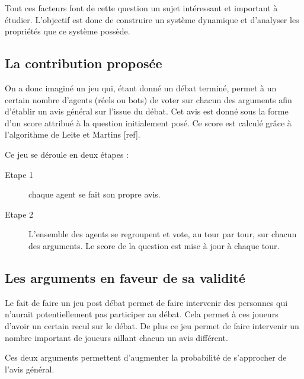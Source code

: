 \documentclass[11pt]{article}
\theoremstyle{defi}
\theoremstyle{not}
\theoremstyle{prob}
\begin{document}
  Tout ces facteurs font de cette question un sujet intéressant et important à étudier. L'objectif est donc de construire un système dynamique et d'analyser les propriétés que ce système possède.


\subsection*{La contribution proposée}
  On a donc imaginé un jeu qui, étant donné un débat terminé, permet à un certain nombre d'agents (réels ou bots) de voter sur chacun des arguments afin d'établir un avis général sur l'issue du débat. Cet avis est donné sous la forme d'un score attribué à la question initialement posé. Ce score est calculé grâce à l'algorithme de Leite et Martins [ref].

  Ce jeu se déroule en deux étapes :
  \begin{description}
    \item[Etape 1] chaque agent se fait son propre avis.
    \item[Etape 2] L'ensemble des agents se regroupent et vote, au tour par tour, sur chacun des arguments. Le score de la question est mise à jour à chaque tour.
  \end{description}


\subsection*{Les arguments en faveur de sa validité}
  Le fait de faire un jeu post débat permet de faire intervenir des personnes qui n'aurait potentiellement pas participer au débat.
  Cela permet à ces joueurs d'avoir un certain recul sur le débat.
  De plus ce jeu permet de faire intervenir un nombre important de joueurs aillant chacun un avis différent.

  Ces deux arguments permettent d'augmenter la probabilité de s'approcher de l'avis général.
\end{document}
